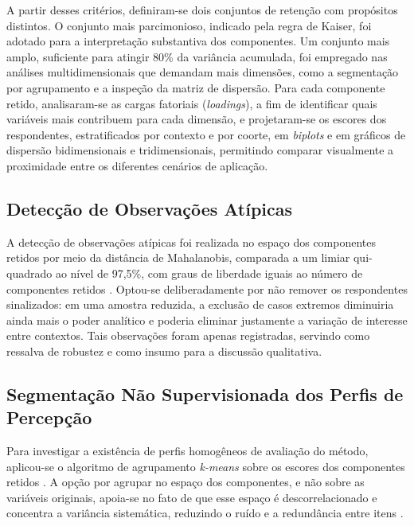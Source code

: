 A partir desses critérios, definiram-se dois conjuntos de retenção com propósitos distintos. O conjunto mais parcimonioso, indicado pela regra de Kaiser, foi adotado para a interpretação substantiva dos componentes. Um conjunto mais amplo, suficiente para atingir 80\% da variância acumulada, foi empregado nas análises multidimensionais que demandam mais dimensões, como a segmentação por agrupamento e a inspeção da matriz de dispersão. Para cada componente retido, analisaram-se as cargas fatoriais (\textit{loadings}), a fim de identificar quais variáveis mais contribuem para cada dimensão, e projetaram-se os escores dos respondentes, estratificados por contexto e por coorte, em \textit{biplots} e em gráficos de dispersão bidimensionais e tridimensionais, permitindo comparar visualmente a proximidade entre os diferentes cenários de aplicação.

\subsection{Detecção de Observações Atípicas}
\label{sec:outliers}

A detecção de observações atípicas foi realizada no espaço dos componentes retidos por meio da distância de Mahalanobis, comparada a um limiar qui-quadrado ao nível de 97{,}5\%, com graus de liberdade iguais ao número de componentes retidos \cite{hair2019}. Optou-se deliberadamente por não remover os respondentes sinalizados: em uma amostra reduzida, a exclusão de casos extremos diminuiria ainda mais o poder analítico e poderia eliminar justamente a variação de interesse entre contextos. Tais observações foram apenas registradas, servindo como ressalva de robustez e como insumo para a discussão qualitativa.

\subsection{Segmentação Não Supervisionada dos Perfis de Percepção}
\label{sec:clustering}

Para investigar a existência de perfis homogêneos de avaliação do método, aplicou-se o algoritmo de agrupamento \textit{k-means} sobre os escores dos componentes retidos \cite{macqueen1967,jain2010}. A opção por agrupar no espaço dos componentes, e não sobre as variáveis originais, apoia-se no fato de que esse espaço é descorrelacionado e concentra a variância sistemática, reduzindo o ruído e a redundância entre itens \cite{hair2019}.

